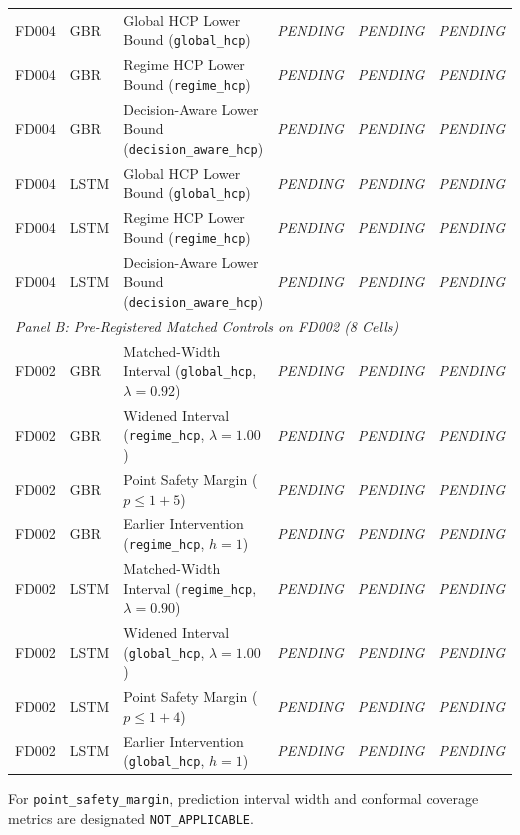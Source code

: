\begin{table}[htbp]
\begin{tabular}{lllccc}
FD004 & GBR  & Global HCP Lower Bound (\texttt{global\_hcp})             & \textit{PENDING} & \textit{PENDING} & \textit{PENDING} \\
FD004 & GBR  & Regime HCP Lower Bound (\texttt{regime\_hcp})             & \textit{PENDING} & \textit{PENDING} & \textit{PENDING} \\
FD004 & GBR  & Decision-Aware Lower Bound (\texttt{decision\_aware\_hcp})& \textit{PENDING} & \textit{PENDING} & \textit{PENDING} \\
FD004 & LSTM & Global HCP Lower Bound (\texttt{global\_hcp})             & \textit{PENDING} & \textit{PENDING} & \textit{PENDING} \\
FD004 & LSTM & Regime HCP Lower Bound (\texttt{regime\_hcp})             & \textit{PENDING} & \textit{PENDING} & \textit{PENDING} \\
FD004 & LSTM & Decision-Aware Lower Bound (\texttt{decision\_aware\_hcp})& \textit{PENDING} & \textit{PENDING} & \textit{PENDING} \\
\midrule
\multicolumn{6}{l}{\textit{Panel B: Pre-Registered Matched Controls on FD002 (8 Cells)}} \\
\midrule
FD002 & GBR  & Matched-Width Interval (\texttt{global\_hcp}, $\lambda=0.92$) & \textit{PENDING} & \textit{PENDING} & \textit{PENDING} \\
FD002 & GBR  & Widened Interval (\texttt{regime\_hcp}, $\lambda=1.00$)       & \textit{PENDING} & \textit{PENDING} & \textit{PENDING} \\
FD002 & GBR  & Point Safety Margin ($p \le 1 + 5$)                          & \textit{PENDING} & \textit{PENDING} & \textit{PENDING} \\
FD002 & GBR  & Earlier Intervention (\texttt{regime\_hcp}, $h=1$)           & \textit{PENDING} & \textit{PENDING} & \textit{PENDING} \\
FD002 & LSTM & Matched-Width Interval (\texttt{regime\_hcp}, $\lambda=0.90$) & \textit{PENDING} & \textit{PENDING} & \textit{PENDING} \\
FD002 & LSTM & Widened Interval (\texttt{global\_hcp}, $\lambda=1.00$)       & \textit{PENDING} & \textit{PENDING} & \textit{PENDING} \\
FD002 & LSTM & Point Safety Margin ($p \le 1 + 4$)                          & \textit{PENDING} & \textit{PENDING} & \textit{PENDING} \\
FD002 & LSTM & Earlier Intervention (\texttt{global\_hcp}, $h=1$)           & \textit{PENDING} & \textit{PENDING} & \textit{PENDING} \\
\bottomrule
\end{tabular}
\begin{flushleft}
\footnotesize For \texttt{point\_safety\_margin}, prediction interval width and conformal coverage metrics are designated \texttt{NOT\_APPLICABLE}.
\end{flushleft}
\end{table}

